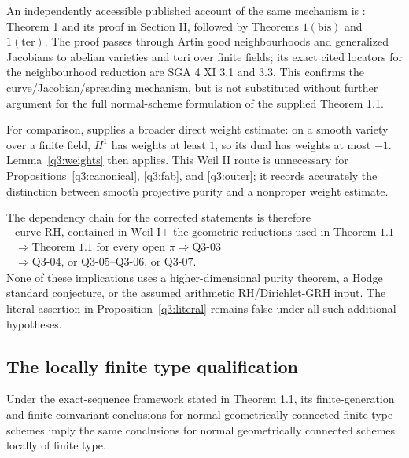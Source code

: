 An independently accessible published account of the same
mechanism is \cite{KatzLang}: Theorem 1 and its proof in
Section II, followed by Theorems \(1(\mathrm{bis})\) and
\(1(\mathrm{ter})\).  The proof passes through Artin good
neighbourhoods and generalized Jacobians to abelian varieties
and tori over finite fields; its exact cited locators for the
neighbourhood reduction are SGA 4 XI 3.1 and 3.3.  This confirms
the curve/Jacobian/spreading mechanism, but is not substituted
without further argument for the full normal-scheme formulation
of the supplied Theorem 1.1.

For comparison, \cite[(3.3.5), p.~206]{WeilII} supplies a broader
direct weight estimate: on a smooth variety over a finite field,
\(H^1\) has weights at least \(1\), so its dual has weights at
most \(-1\).  Lemma~\ref{q3:weights} then applies.  This Weil II
route is unnecessary for
Propositions~\ref{q3:canonical}, \ref{q3:fab}, and
\ref{q3:outer}; it records accurately the distinction between
smooth projective purity and a nonproper weight estimate.

The dependency chain for the corrected statements is therefore
\[
\begin{gathered}
\text{curve RH, contained in Weil I}
+\text{ the geometric reductions used in Theorem 1.1}\\
\Longrightarrow
\text{Theorem 1.1 for every open }\pi
\Longrightarrow \text{Q3-03}\\
\Longrightarrow
\text{Q3-04, or Q3-05--Q3-06, or Q3-07}.
\end{gathered}
\]
None of these implications uses a higher-dimensional purity
theorem, a Hodge standard conjecture, or the assumed arithmetic
RH/Dirichlet-GRH input.  The literal assertion in
Proposition~\ref{q3:literal} remains false under all such
additional hypotheses.

\subsection{The locally finite type qualification}

\begin{lemma}
\label{q3:affine}
Under the exact-sequence framework stated in Theorem 1.1, its
finite-generation and finite-coinvariant conclusions for normal
geometrically connected finite-type schemes imply the same
conclusions for normal geometrically connected schemes locally
of finite type.
\end{lemma}

